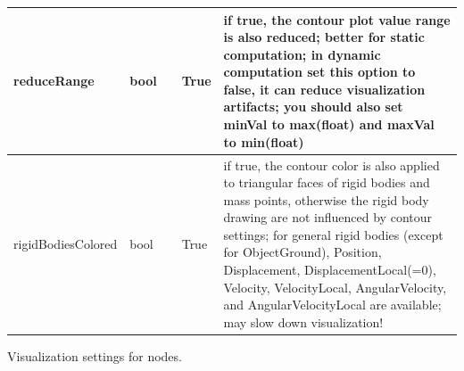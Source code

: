 \begin{center}
\begin{longtable}{| p{4.2cm} | p{2.5cm} | p{0.3cm} | p{3.0cm} | p{6cm} |}
    reduceRange &     bool &      &     True &     if true, the contour plot value range is also reduced; better for static computation; in dynamic computation set this option to false, it can reduce visualization artifacts; you should also set minVal to max(float) and maxVal to min(float)\\ \hline
    rigidBodiesColored &     bool &      &     True &     if true, the contour color is also applied to triangular faces of rigid bodies and mass points, otherwise the rigid body drawing are not influenced by contour settings; for general rigid bodies (except for ObjectGround), Position, Displacement, DisplacementLocal(=0), Velocity, VelocityLocal, AngularVelocity, and AngularVelocityLocal are available; may slow down visualization!\\ \hline
	  \end{longtable}
	\end{center}



\label{sec:VSettingsNodes}
Visualization settings for nodes.

